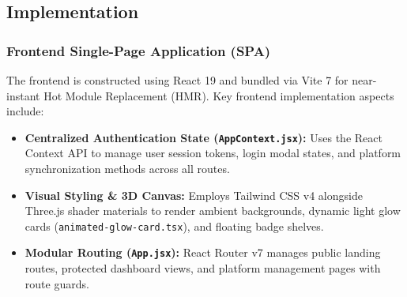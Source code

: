 \documentclass[12pt,a4paper]{article}
\begin{document}
\begin{table}[H]
\centering
\caption{System RESTful API Endpoints}
\label{tab:api_endpoints}
\end{table}

\subsection{Implementation}

\subsubsection{Frontend Single-Page Application (SPA)}
The frontend is constructed using React 19 and bundled via Vite 7 for near-instant Hot Module Replacement (HMR). Key frontend implementation aspects include:
\begin{itemize}[leftmargin=*]
    \item \textbf{Centralized Authentication State (\texttt{AppContext.jsx}):} Uses the React Context API to manage user session tokens, login modal states, and platform synchronization methods across all routes.
    \item \textbf{Visual Styling \& 3D Canvas:} Employs Tailwind CSS v4 alongside Three.js shader materials to render ambient backgrounds, dynamic light glow cards (\texttt{animated-glow-card.tsx}), and floating badge shelves.
    \item \textbf{Modular Routing (\texttt{App.jsx}):} React Router v7 manages public landing routes, protected dashboard views, and platform management pages with route guards.
\end{itemize}
\end{document}
